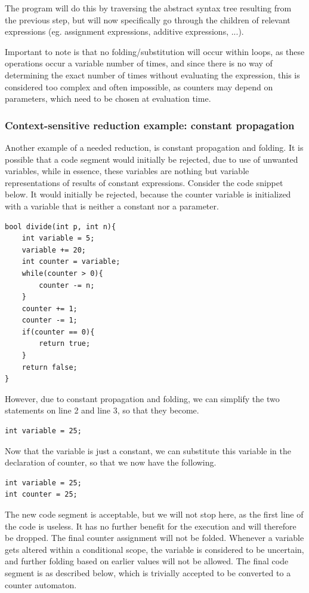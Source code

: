 \documentclass[12pt]{article}
\begin{document}
The program will do this by traversing the abstract syntax tree resulting from the previous step, but will now specifically go through the children of relevant expressions (eg. assignment expressions, additive expressions, ...).

Important to note is that no folding/substitution will occur within loops, as these operations occur a variable number of times, and since there is no way of determining the exact number of times without evaluating the expression, this is considered too complex and often impossible, as counters may depend on parameters, which need to be chosen at evaluation time.


\subsubsection{Context-sensitive reduction example: constant propagation}
Another example of a needed reduction, is constant propagation and folding. It is possible that a code segment would initially be rejected, due to use of unwanted variables, while in essence, these variables are nothing but variable representations of results of constant expressions. Consider the code snippet below. It would initially be rejected, because the counter variable is initialized with a variable that is neither a constant nor a parameter.
\newpage
\begin{lstlisting}[style=CStyle]
bool divide(int p, int n){
	int variable = 5;
	variable += 20;
	int counter = variable;
	while(counter > 0){
		counter -= n;
	}
	counter += 1;
	counter -= 1;
	if(counter == 0){
		return true;
	}
	return false;
}
\end{lstlisting}

However, due to constant propagation and folding, we can simplify the two statements on line 2 and line 3, so that they become.

\begin{lstlisting}[style=CStyle]
int variable = 25;
\end{lstlisting}

Now that the variable is just a constant, we can substitute this variable in the declaration of counter, so that we now have the following.
\begin{lstlisting}[style=CStyle]
int variable = 25;
int counter = 25;
\end{lstlisting}

The new code segment is acceptable, but we will not stop here, as the first line of the code is useless. It has no further benefit for the execution and will therefore be dropped. The final counter assignment will not be folded. Whenever a variable gets altered within a conditional scope, the variable is considered to be uncertain, and further folding based on earlier values will not be allowed. The final code segment is as described below, which is trivially accepted to be converted to a counter automaton.
\end{document}
